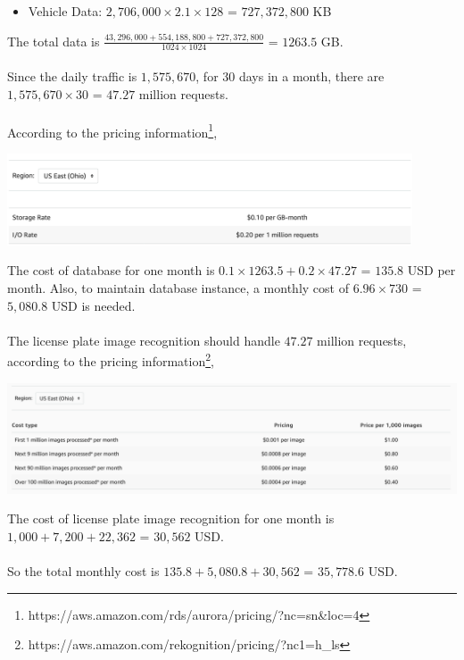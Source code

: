 \documentclass[11pt]{article}
\begin{document}
\begin{solution}
\begin{itemize}
\item Vehicle Data: $2,706,000 \times 2.1 \times 128$ = $727,372,800$ KB
\end{itemize} 
The total data is $\frac{43,296,000 + 554,188,800 + 727,372,800}{1024 \times 1024}$ = $1263.5$ GB.
\\
\\
Since the daily traffic is $1,575,670$, for $30$ days in a month, there are $1,575,670 \times 30$ = $47.27$ million requests. 
\\ 
\\
According to the pricing information\footnote{https://aws.amazon.com/rds/aurora/pricing/?nc=sn\&loc=4},
\begin{center}
\includegraphics[width=12cm]{p1_3.png}
\end{center}
The cost of database for one month is $0.1 \times 1263.5 + 0.2 \times 47.27$ = $135.8$ USD per month. Also, to maintain database instance, a monthly cost of $6.96 \times 730$ = $5,080.8$ USD is needed.
\\
\\
The license plate image recognition should handle $47.27$ million requests, according to the pricing information\footnote{https://aws.amazon.com/rekognition/pricing/?nc1=h\_ls}, 
\begin{center}
\includegraphics[width=15cm]{p1_33.png}
\end{center}
The cost of license plate image recognition for one month is $1,000 + 7,200 + 22,362$ = $30,562$ USD.
\\
\\
So the total monthly cost is $135.8 + 5,080.8 + 30,562$ = $35,778.6$ USD.
\end{solution}
\setcounter{page}{4}
\end{document}

